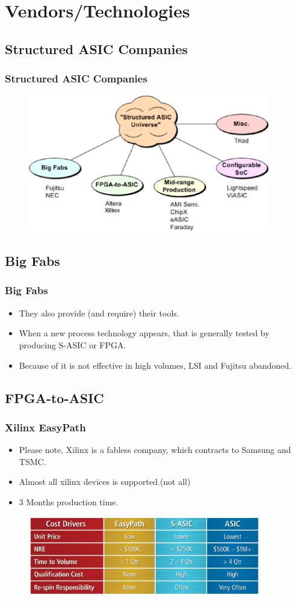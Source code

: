 \documentclass{beamer}
\begin{document}
\section{Vendors/Technologies}
\subsection{Structured ASIC Companies}
\frame
{
  \frametitle{Structured ASIC Companies}
  \begin{figure}[H]
  \includegraphics[height=60mm]{images/vendors.eps}
  \end{figure}
}

\subsection{Big Fabs}
\frame
{
  \frametitle{Big Fabs}
  \begin{itemize}
  \item They also provide (and require) their tools.
  \item When a new process technology appears, that is generally tested by producing S-ASIC or FPGA. 
  \item Because of it is not effective in high volumes, LSI and Fujitsu abandoned.
  \end{itemize}
}

\subsection{FPGA-to-ASIC}
\frame
{
  \frametitle{Xilinx EasyPath}
  \begin{itemize}
  \item Please note, Xilinx is a fabless company, which contracts to Samsung and TSMC.
  \item Almost all xilinx devices is supported.(not all)
  \item 3 Months production time.
  \end{itemize}
  \begin{figure}[H]
  \includegraphics[height=35mm]{images/easypath.eps}
  \end{figure}
}
\end{document}
